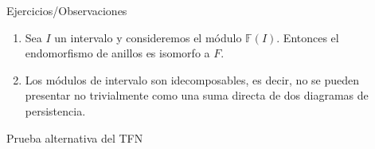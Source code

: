 \documentclass{beamer}
\newcounter{Ejercicio}
\def\F {\mathbb{F}}
\begin{document}
\begin{frame}{Ejercicios/Observaciones}
    \begin{enumerate}
        \item Sea $I$ un intervalo y consideremos el módulo $\F(I)$. Entonces el endomorfismo de anillos es isomorfo a $F$.
        \pause 
        \item Los módulos de intervalo son idecomposables, es decir, no se pueden presentar no trivialmente como una suma directa de dos diagramas de persistencia.
    \end{enumerate}
\end{frame}

\begin{frame}{Prueba alternativa del TFN}
    
\end{frame}
\end{document}
